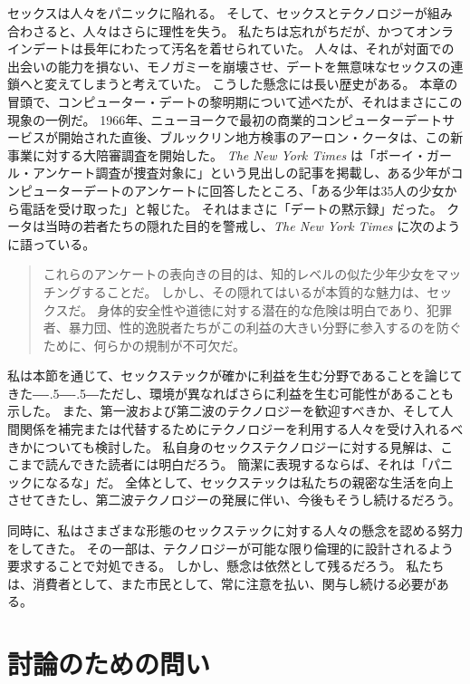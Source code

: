 \documentclass[paper=a4,book,openany]{jlreq}
\newcommand{\ig}[1]{}           %
\def\DDASH{―\kern-.5\zw―\kern-.5\zw―}
\begin{document}
セックスは人々をパニックに陥れる。
そして、セックスとテクノロジーが組み合わさると、人々はさらに理性を失う。
私たちは忘れがちだが、かつてオンラインデートは長年にわたって汚名を着せられていた。
人々は、それが対面での出会いの能力を損ない、モノガミーを崩壊させ、デートを無意味なセックスの連鎖へと変えてしまうと考えていた。
こうした懸念には長い歴史がある。
本章の冒頭で、コンピューター・デートの黎明期について述べたが、それはまさにこの現象の一例だ。
1966年、ニューヨークで最初の商業的コンピューターデートサービスが開始された直後、ブルックリン地方検事のアーロン・クータ\ig{Aaron E. Koota}は、この新事業に対する大陪審調査を開始した。
\emph{The New York Times} は「ボーイ・ガール・アンケート調査が捜査対象に」という見出しの記事を掲載し、ある少年がコンピューターデートのアンケートに回答したところ、「ある少年は35人の少女から電話を受け取った」と報じた。
それはまさに「デートの黙示録」だった。
クータは当時の若者たちの隠れた目的を警戒し、\emph{The New York Times} に次のように語っている。

\begin{quote}
  これらのアンケートの表向きの目的は、知的レベルの似た少年少女をマッチングすることだ。
しかし、その隠れてはいるが本質的な魅力は、セックスだ。
身体的安全性や道徳に対する潜在的な危険は明白であり、犯罪者、暴力団、性的逸脱者たちがこの利益の大きい分野に参入するのを防ぐために、何らかの規制が不可欠だ。
\citep{anderson66:_boy_girl_quest_inves}\ig{David Anderson}
\end{quote}

私は本節を通じて、セックステックが確かに利益を生む分野であることを論じてきた{\DDASH}ただし、環境が異なればさらに利益を生む可能性があることも示した。
また、第一波および第二波のテクノロジーを歓迎すべきか、そして人間関係を補完または代替するためにテクノロジーを利用する人々を受け入れるべきかについても検討した。
私自身のセックステクノロジーに対する見解は、ここまで読んできた読者には明白だろう。
簡潔に表現するならば、それは「パニックになるな」だ。
全体として、セックステックは私たちの親密な生活を向上させてきたし、第二波テクノロジーの発展に伴い、今後もそうし続けるだろう。

同時に、私はさまざまな形態のセックステックに対する人々の懸念を認める努力をしてきた。
その一部は、テクノロジーが可能な限り倫理的に設計されるよう要求することで対処できる。
しかし、懸念は依然として残るだろう。
私たちは、消費者として、また市民として、常に注意を払い、関与し続ける必要がある。

\section{討論のための問い}
\end{document}
